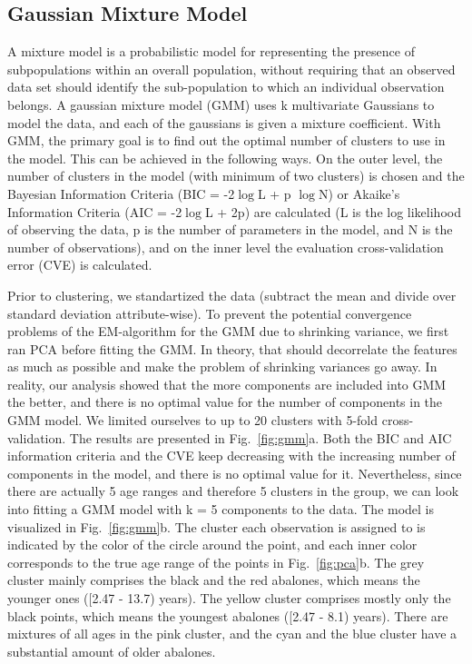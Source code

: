 \documentclass[10pt, paper=a4]{article}
\begin{document}
\subsection{Gaussian Mixture Model}
A mixture model is a probabilistic model for representing the presence of
subpopulations within an overall population, without requiring that an observed
data set should identify the sub-population to which an individual observation
belongs.  A gaussian mixture model (GMM) uses k multivariate Gaussians to model
the data, and each of the gaussians is given a mixture coefficient.  With GMM,
the primary goal is to find out the optimal number of clusters to use in the
model.  This can be achieved in the following ways.  On the outer level, the
number of clusters in the model (with minimum of two clusters) is chosen and the
Bayesian Information Criteria (BIC = -2$\log$L + p $\log$N) or Akaike's
Information Criteria (AIC = -2$\log$L + 2p) are calculated (L is the log
likelihood of observing the data, p is the number of parameters in the model,
and N is the number of observations), and on the inner level the evaluation
cross-validation error (CVE) is calculated.

Prior to clustering, we standartized the data (subtract the mean and divide over
standard deviation attribute-wise).  To prevent the potential convergence
problems of the EM-algorithm for the GMM due to shrinking variance, we first ran
PCA before fitting the GMM.  In theory, that should decorrelate the features as
much as possible and make the problem of shrinking variances go away.  In
reality, our analysis showed that the more components are included into GMM the
better, and there is no optimal value for the number of components in the GMM
model.  We limited ourselves to up to 20 clusters with 5-fold cross-validation.
The results are presented in Fig.~\ref{fig:gmm}a.  Both the BIC and AIC
information criteria and the CVE keep decreasing with the increasing number of
components in the model, and there is no optimal value for it.  Nevertheless,
since there are actually 5 age ranges and therefore 5 clusters in the group, we
can look into fitting a GMM model with k = 5 components to the data.  The model
is visualized in Fig.~\ref{fig:gmm}b.  The cluster each observation is assigned
to is indicated by the color of the circle around the point, and each inner
color corresponds to the true age range of the points in Fig.~\ref{fig:pca}b.
The grey cluster mainly comprises the black and the red abalones, which means
the younger ones ([2.47 - 13.7) years).  The yellow cluster comprises mostly
  only the black points, which means the youngest abalones ([2.47 - 8.1) years).
    There are mixtures of all ages in the pink cluster, and the cyan and the
    blue cluster have a substantial amount of older abalones.
\end{document}
